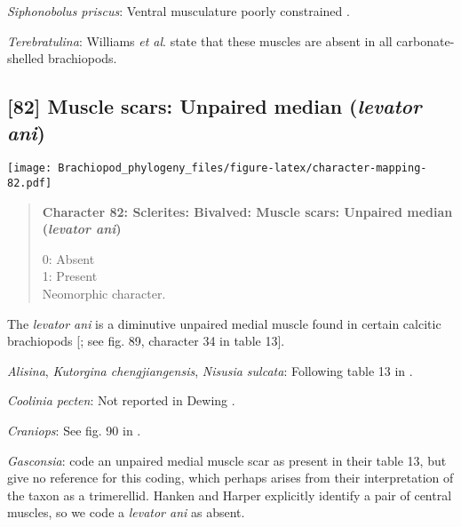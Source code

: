 \documentclass[openany]{book}
\theoremstyle{definition}
\theoremstyle{definition}
\theoremstyle{definition}
\theoremstyle{remark}
\begin{document}
\hypertarget{Siphonobolus_priscus-coding-81}{}
\emph{Siphonobolus priscus}: Ventral musculature poorly constrained
\citep{Williams2000LinguliformeaCraniiformea, Popov2009Earlyontogeny}.

\hypertarget{Terebratulina-coding-81}{}
\emph{Terebratulina}: Williams \emph{et al}.
\citeyearpar[p.~32]{Williams2000LinguliformeaCraniiformea} state that
these muscles are absent in all carbonate-shelled brachiopods.

\subsection*{\texorpdfstring{{[}82{]} Muscle scars: Unpaired median
(\emph{levator
ani})}{{[}82{]} Muscle scars: Unpaired median (levator ani)}}\label{muscle-scars-unpaired-median-levator-ani}

\texttt{[image: Brachiopod\_phylogeny\_files/figure-latex/character-mapping-82.pdf]}

\begin{quote}
\textbf{Character 82: Sclerites: Bivalved: Muscle scars: Unpaired median
(\emph{levator ani})}

0: Absent\\
1: Present\\
Neomorphic character.
\end{quote}

The \emph{levator ani} is a diminutive unpaired medial muscle found in
certain calcitic brachiopods
{[}\citet{Williams2000LinguliformeaCraniiformea}; see fig. 89, character
34 in table 13{]}.

\hypertarget{Alisina-coding-82}{}
\emph{Alisina}, \emph{Kutorgina chengjiangensis}, \emph{Nisusia
sulcata}: Following table 13 in
\citet{Williams2000LinguliformeaCraniiformea}.

\hypertarget{Coolinia_pecten-coding-82}{}
\emph{Coolinia pecten}: Not reported in Dewing
\citeyearpar{Dewing2001Hingemodifications}.

\hypertarget{Craniops-coding-82}{}
\emph{Craniops}: See fig. 90 in
\citet{Williams2000LinguliformeaCraniiformea}.

\hypertarget{Gasconsia-coding-82}{}
\emph{Gasconsia}: \citet{Williams2000LinguliformeaCraniiformea} code an
unpaired medial muscle scar as present in their table 13, but give no
reference for this coding, which perhaps arises from their
interpretation of the taxon as a trimerellid. Hanken and Harper
\citeyearpar[p.~249 and text-fig. 2]{Hanken1985Thetaxonomy} explicitly
identify a pair of central muscles, so we code a \emph{levator ani} as
absent.
\end{document}
